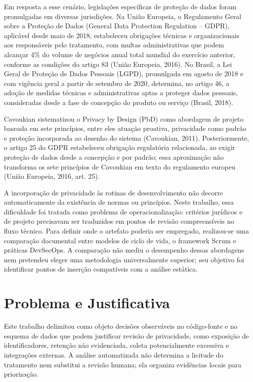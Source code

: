 \documentclass[12pt,a4paper,oneside]{report}
\newcommand{\secaointro}[1]{\section*{#1}\addcontentsline{toc}{section}{#1}}
\begin{document}
Em resposta a esse cenário, legislações específicas de proteção de dados foram promulgadas em diversas jurisdições. Na União Europeia, o Regulamento Geral sobre a Proteção de Dados (General Data Protection Regulation -- GDPR), aplicável desde maio de 2018, estabeleceu obrigações técnicas e organizacionais aos responsáveis pelo tratamento, com multas administrativas que podem alcançar 4\% do volume de negócios anual total mundial do exercício anterior, conforme as condições do artigo 83 (União Europeia, 2016). No Brasil, a Lei Geral de Proteção de Dados Pessoais (LGPD), promulgada em agosto de 2018 e com vigência geral a partir de setembro de 2020, determina, no artigo 46, a adoção de medidas técnicas e administrativas aptas a proteger dados pessoais, consideradas desde a fase de concepção do produto ou serviço (Brasil, 2018).

Cavoukian sistematizou o Privacy by Design (PbD) como abordagem de projeto baseada em sete princípios, entre eles atuação proativa, privacidade como padrão e proteção incorporada ao desenho do sistema (Cavoukian, 2011). Posteriormente, o artigo 25 do GDPR estabeleceu obrigação regulatória relacionada, ao exigir proteção de dados desde a concepção e por padrão; essa aproximação não transforma os sete princípios de Cavoukian em texto do regulamento europeu (União Europeia, 2016, art. 25).

A incorporação de privacidade às rotinas de desenvolvimento não decorre automaticamente da existência de normas ou princípios. Neste trabalho, essa dificuldade foi tratada como problema de operacionalização: critérios jurídicos e de projeto precisavam ser traduzidos em pontos de revisão compreensíveis no fluxo técnico. Para definir onde o artefato poderia ser empregado, realizou-se uma comparação documental entre modelos de ciclo de vida, o framework Scrum e práticas DevSecOps. A comparação não mediu o desempenho dessas abordagens nem pretendeu eleger uma metodologia universalmente superior; seu objetivo foi identificar pontos de inserção compatíveis com a análise estática.

\secaointro{Problema e Justificativa}

Este trabalho delimitou como objeto decisões observáveis no código-fonte e no esquema de dados que podem justificar revisão de privacidade, como exposição de identificadores, retenção não evidenciada, coleta potencialmente excessiva e integrações externas. A análise automatizada não determina a licitude do tratamento nem substitui a revisão humana; ela organiza evidências locais para priorização.
\end{document}
